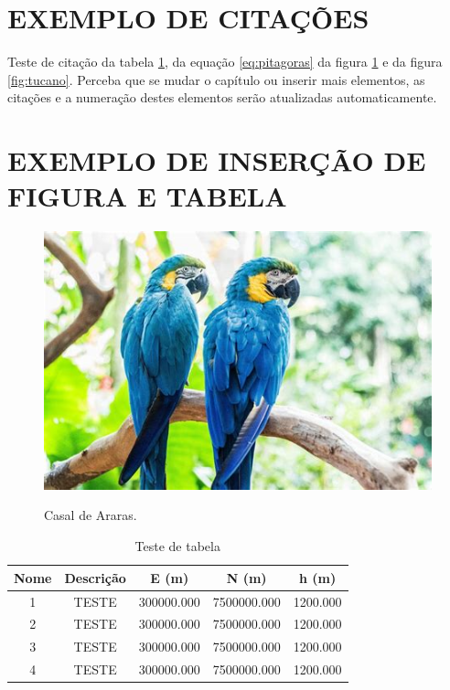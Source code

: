 \documentclass[
    12pt,				%
    a4paper,            %
    oneside,			%
    openright,			%
    ruledheader,
    anapcustomindent,
    sumario = tradicional,
    abntfigtabnum,
    tocpage=plain,
    english,			%
	brazil,				%
    ]{abntex-ifrn/abntex2-trabalho} %
\begin{document}
    \lipsum[1]
    
    \section{EXEMPLO DE CITAÇÕES}
    Teste de citação da tabela \ref{tab:tabela-teste}, da equação \ref{eq:pitagoras} da figura \ref{fig:casal-araras} e da figura \ref{fig:tucano}. Perceba que se mudar o capítulo ou inserir mais elementos, as citações e a numeração destes elementos serão atualizadas automaticamente.
    
    \section{EXEMPLO DE INSERÇÃO DE FIGURA E TABELA}
    \begin{figure}[htpb]
        \centering
        \caption{Casal de Araras.}
        \includegraphics[width=.5\textwidth]{imagem/arara1.jpg}
        \label{fig:casal-araras}
    \end{figure}
    
    \begin{table}[htbp]
      \centering
      \caption{Teste de tabela}
        \begin{tabular}{ccccc}
        \toprule
        Nome  & Descrição & E (m)     & N (m)    & h (m) \\
        \midrule
        1     & TESTE & 300000.000 & 7500000.000 & 1200.000 \\
        2     & TESTE & 300000.000 & 7500000.000 & 1200.000 \\
        3     & TESTE & 300000.000 & 7500000.000 & 1200.000 \\
        4     & TESTE & 300000.000 & 7500000.000 & 1200.000 \\
        \bottomrule
        \end{tabular}%
      \label{tab:tabela-teste} %
    \end{table}%
\end{document}
